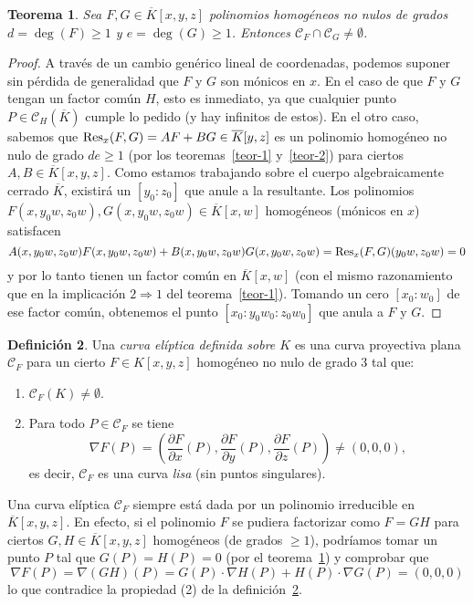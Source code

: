 \documentclass[a4paper, 11pt]{article}
\newcounter{numerodetema}
\theoremstyle{plain}
\newtheorem{teor}{Teorema}[numerodetema]
\theoremstyle{definition}
\newtheorem{defi}[teor]{Definición}
\begin{document}
\begin{teor}\label{int-no-vacia}
Sea $F,G\in\overline{K}[x,y,z]$ polinomios homogéneos no nulos de grados $d=\deg(F)\geq1$
y $e=\deg(G)\geq 1$. Entonces $\mathcal{C}_F\cap\mathcal{C}_G\neq\emptyset$.
\end{teor}
\begin{proof}
A través de un cambio genérico lineal de coordenadas, podemos suponer sin pérdida de
generalidad que $F$ y $G$ son mónicos en $x$.
En el caso de que $F$ y $G$ tengan un factor común $H$, esto es inmediato, ya que
cualquier punto $P\in\mathcal{C}_H(\overline{K})$ cumple lo pedido (y hay infinitos de
estos). En el otro caso, sabemos que ${\rm Res}_x(F,G)=AF+BG\in\overline{K}[y,z]$ es un
polinomio homogéneo no nulo de grado $de\geq 1$ (por los teoremas~\ref{teor-1}
y~\ref{teor-2}) para ciertos $A,B\in\overline{K}[x,y,z]$. Como estamos trabajando sobre
el cuerpo algebraicamente cerrado $\overline{K}$, existirá un $[y_0:z_0]$ que anule a
la resultante. Los polinomios $F(x,y_0w,z_0w), G(x,y_0w,z_0w)\in\overline{K}[x,w]$
homogéneos (mónicos en $x$) satisfacen
\[
 A(x,y_0w,z_0w)F(x,y_0w,z_0w)+B(x,y_0w,z_0w)G(x,y_0w,z_0w)={\rm Res}_x(F,G)(y_0w,z_0w)=0
\]
y por lo tanto tienen un factor común en $\overline{K}[x,w]$ (con el mismo razonamiento
que en la implicación $2\Rightarrow1$ del teorema~\ref{teor-1}). Tomando un cero
$[x_0:w_0]$ de ese factor común, obtenemos el punto $[x_0:y_0w_0:z_0w_0]$ que anula a $F$ y
$G$.
\end{proof}

\bigskip

\begin{defi}\label{def-elip}
Una \emph{curva elíptica definida sobre $K$} es una curva proyectiva plana
$\mathcal{C}_F$ para un cierto $F\in K[x,y,z]$ homogéneo no nulo de grado $3$
tal que:
\begin{enumerate}
\item $\mathcal{C}_F(K)\neq\emptyset$.
\item Para todo $P\in\mathcal{C}_F$ se tiene
\[
   \nabla F(P)=\left(\frac{\partial F}{\partial x}(P),
                     \frac{\partial F}{\partial y}(P),
                     \frac{\partial F}{\partial z}(P)\right)\neq (0,0,0),
\]
es decir, $\mathcal{C}_F$ es una curva \emph{lisa} (sin puntos singulares).
\end{enumerate}
\end{defi}

\bigskip

Una curva elíptica $\mathcal{C}_F$ siempre está dada por un polinomio irreducible
en $\overline{K}[x,y,z]$. En efecto, si el polinomio $F$ se pudiera factorizar como
$F=GH$ para ciertos $G,H\in\overline{K}[x,y,z]$ homogéneos (de grados $\geq 1$),
podríamos tomar un punto $P$ tal que $G(P)=H(P)=0$ (por el teorema~\ref{int-no-vacia})
y comprobar que
\[
   \nabla F(P)=\nabla(GH)(P)=G(P)\cdot\nabla H(P) + H(P)\cdot\nabla G(P) = (0,0,0)
\]
lo que contradice la propiedad (2) de la definición~\ref{def-elip}.
\end{document}
